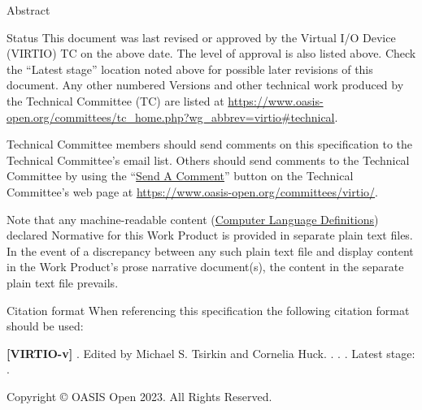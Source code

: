 \begin{titlepage}
\begin{oasistitlesection}{Abstract}

\end{oasistitlesection}

\begin{oasistitlesection}{Status}
This document was last revised or approved by the Virtual I/O Device
(VIRTIO) TC on the above date. The level of approval is also listed above. Check the ``Latest stage'' location noted above for possible later revisions of this document.
Any other numbered Versions and other
technical work produced by the Technical Committee (TC) are
listed at
\url{https://www.oasis-open.org/committees/tc_home.php?wg_abbrev=virtio#technical}.

Technical Committee members should send comments on this
specification to the Technical Committee’s email list. Others
should send comments to the Technical Committee by using the
``\href{https://www.oasis-open.org/committees/comments/form.php?wg_abbrev=virtio}{Send
A Comment}'' button on the Technical Committee’s web page at
\url{https://www.oasis-open.org/committees/virtio/}.



Note that any machine-readable content
(\href{https://www.oasis-open.org/policies-guidelines/tc-process#wpComponentsCompLang}
{Computer Language Definitions}) declared Normative for this Work
Product is provided in separate plain text files. In the event of
a discrepancy between any such plain text file and display
content in the Work Product's prose narrative document(s), the
content in the separate plain text file prevails.

\end{oasistitlesection}


\begin{oasistitlesection}{Citation format}
When referencing this specification the following citation format should be used:\newline

\textbf{[VIRTIO-v\virtiorev]}\newline
\textit{\virtioversion}. Edited by Michael S. Tsirkin and Cornelia Huck. \virtioworkingdraftdate.
\virtiodraftoasisstagename \virtiodraftstageextra . \virtiourlhtml .
Latest stage: \virtiourllatesthtml .
\end{oasistitlesection}

\vfill\newpage


Copyright © OASIS Open 2023. All Rights Reserved.


\end{titlepage}
